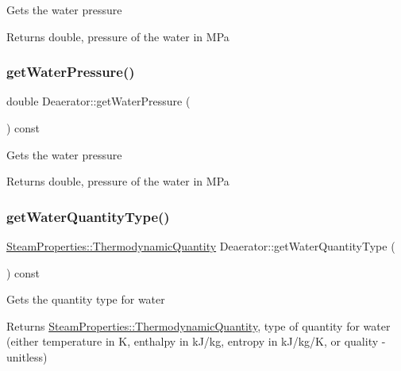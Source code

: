 Gets the water pressure \begin{DoxyReturn}{Returns}
double, pressure of the water in M\+Pa 
\end{DoxyReturn}
\mbox{\label{class_deaerator_ae86ef305a8641d61ec76bd39bb84f28b}} 
\subsubsection{\texorpdfstring{get\+Water\+Pressure()}{getWaterPressure()}\hspace{0.1cm}{\footnotesize\ttfamily [3/3]}}
{\footnotesize\ttfamily double Deaerator\+::get\+Water\+Pressure (\begin{DoxyParamCaption}{ }\end{DoxyParamCaption}) const}

Gets the water pressure \begin{DoxyReturn}{Returns}
double, pressure of the water in M\+Pa 
\end{DoxyReturn}
\mbox{\label{class_deaerator_a414282f81906e09a28bc75cf51659ec2}} 
\subsubsection{\texorpdfstring{get\+Water\+Quantity\+Type()}{getWaterQuantityType()}\hspace{0.1cm}{\footnotesize\ttfamily [1/3]}}
{\footnotesize\ttfamily \hyperlink{class_steam_properties_ae0294bedf7d178c2d8fb6aed0f62fbff}{Steam\+Properties\+::\+Thermodynamic\+Quantity} Deaerator\+::get\+Water\+Quantity\+Type (\begin{DoxyParamCaption}{ }\end{DoxyParamCaption}) const}

Gets the quantity type for water \begin{DoxyReturn}{Returns}
\hyperlink{class_steam_properties_ae0294bedf7d178c2d8fb6aed0f62fbff}{Steam\+Properties\+::\+Thermodynamic\+Quantity}, type of quantity for water (either temperature in K, enthalpy in k\+J/kg, entropy in k\+J/kg/K, or quality -\/ unitless) 
\end{DoxyReturn}
\mbox{\label{class_deaerator_a414282f81906e09a28bc75cf51659ec2}} 
